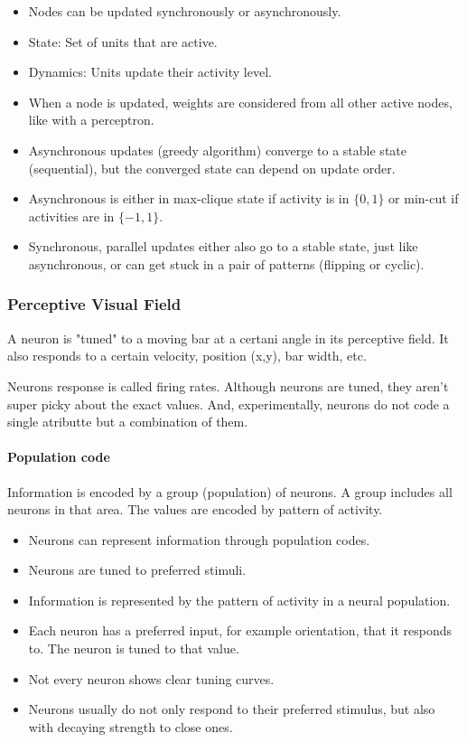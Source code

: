 \documentclass[main]{subfiles}
\begin{document}
\begin{itemize}[noitemsep,nolistsep]
	\item Nodes can be updated synchronously or asynchronously.
	\item State: Set of units that are active.
	\item Dynamics: Units update their activity level.
	\item When a node is updated, weights are considered from all other active nodes, like with a perceptron.
	\item Asynchronous updates (greedy algorithm) converge to a stable state (sequential), but the converged state can depend on update order.
	\item Asynchronous is either in max-clique state if activity is in $\{0,1\}$ or min-cut if activities are in $\{-1,1\}$.
	\item Synchronous, parallel updates either also go to a stable state, just like asynchronous, or can get stuck in a pair of patterns (flipping or cyclic).
\end{itemize}

\subsubsection{Perceptive Visual Field}

A neuron is "tuned" to a moving bar at a certani angle in its perceptive field. It also responds to a certain velocity, position (x,y), bar width, etc.

Neurons response is called firing rates. Although neurons are tuned, they aren't super picky about the exact values. And, experimentally, neurons do not code a single atributte but a combination of them.

\paragraph{Population code}

Information is encoded by a group (population) of neurons. A group includes all neurons in that area. The values are encoded by pattern of activity.

\begin{itemize}[noitemsep,nolistsep]
	\item Neurons can represent information through population codes.
	\item Neurons are tuned to preferred stimuli.
	\item Information is represented by the pattern of activity in a neural population.
	\item Each neuron has a preferred input, for example orientation, that it responds to. The neuron is tuned to that value.
	\item Not every neuron shows clear tuning curves.
	\item Neurons usually do not only respond to their preferred stimulus, but also with decaying strength to close ones.
\end{itemize}
\end{document}
